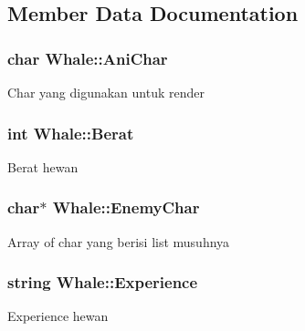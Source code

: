 \subsection{Member Data Documentation}
\subsubsection[{\texorpdfstring{Ani\+Char}{AniChar}}]{\setlength{\rightskip}{0pt plus 5cm}char Whale\+::\+Ani\+Char\hspace{0.3cm}{\ttfamily [protected]}}\hypertarget{class_whale_affdf9a0186493bbcbe217456989c7f2c}{}\label{class_whale_affdf9a0186493bbcbe217456989c7f2c}
Char yang digunakan untuk render 
\subsubsection[{\texorpdfstring{Berat}{Berat}}]{\setlength{\rightskip}{0pt plus 5cm}int Whale\+::\+Berat\hspace{0.3cm}{\ttfamily [protected]}}\hypertarget{class_whale_a177b61e8fceab1b015430a025b216680}{}\label{class_whale_a177b61e8fceab1b015430a025b216680}
Berat hewan 
\subsubsection[{\texorpdfstring{Enemy\+Char}{EnemyChar}}]{\setlength{\rightskip}{0pt plus 5cm}char$\ast$ Whale\+::\+Enemy\+Char\hspace{0.3cm}{\ttfamily [protected]}}\hypertarget{class_whale_a8e98aa344c135aeae130f772e63485da}{}\label{class_whale_a8e98aa344c135aeae130f772e63485da}
Array of char yang berisi list musuhnya 
\subsubsection[{\texorpdfstring{Experience}{Experience}}]{\setlength{\rightskip}{0pt plus 5cm}string Whale\+::\+Experience\hspace{0.3cm}{\ttfamily [protected]}}\hypertarget{class_whale_a0b676e34e00b916f2c9dee9f86f1508d}{}\label{class_whale_a0b676e34e00b916f2c9dee9f86f1508d}
Experience hewan 
